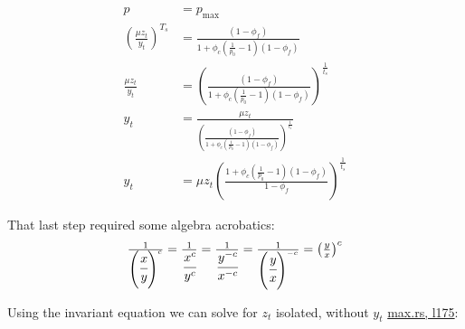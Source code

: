 \begin{equation}
\begin{aligned}
p &= p_{\text{max}} \\
\left( \tfrac{\mu z_{t}}{y_{t}} \right)^{T_s} &= \tfrac{(1 - \phi_{f})}{1 + \phi_{c} \left( \tfrac{1}{p_{0}}-1 \right)(1-\phi_{f})} \\
\tfrac{\mu z_{t}}{y_{t}} &= \left( \tfrac{\left( 1 - \phi_{f} \right)}{1 + \phi_{c} \left( \tfrac{1}{p_{0}}-1 \right) \left( 1-\phi_{f} \right)} \right)^{\tfrac{1}{t_{s}}} \\
y_{t} &= \tfrac{\mu z_{t}}{\left( \tfrac{(1 - \phi_{f})}{1 + \phi_{c} \left( \tfrac{1}{p_{0}}-1 \right)(1-\phi_{f})} \right)^{\tfrac{1}{t_{s}}}} \\
y_{t} &= \mu z_{t} \left( \tfrac{1 + \phi_{c} (\tfrac{1}{p_{0}} - 1) (1 - \phi_{f})}{1 - \phi_{f}} \right)^{\tfrac{1}{t_{s}}}
\end{aligned}
\end{equation}

\begin{callout}
That last step required some algebra acrobatics:
\begin{displaymath}
\tfrac{1}{\left( \cfrac{x}{y} \right)^{c}} = \tfrac{1}{\cfrac{x^c}{y^c}} = \tfrac{1}{\cfrac{y^{-c}}{x^{-c}}} = \tfrac{1}{\left( \cfrac{y}{x} \right)^{-c}} = \left( \tfrac{y}{x} \right)^{c}
\end{displaymath}
\end{callout}

Using the invariant equation we can solve for $z_{t}$ isolated, without $y_{t}$ \href{https://github.com/delvtech/hyperdrive/blob/570263e2b85c411b4097132bfe7ad2a085e3180b/crates/hyperdrive-math/src/long/max.rs#L175}{max.rs, l175}:

